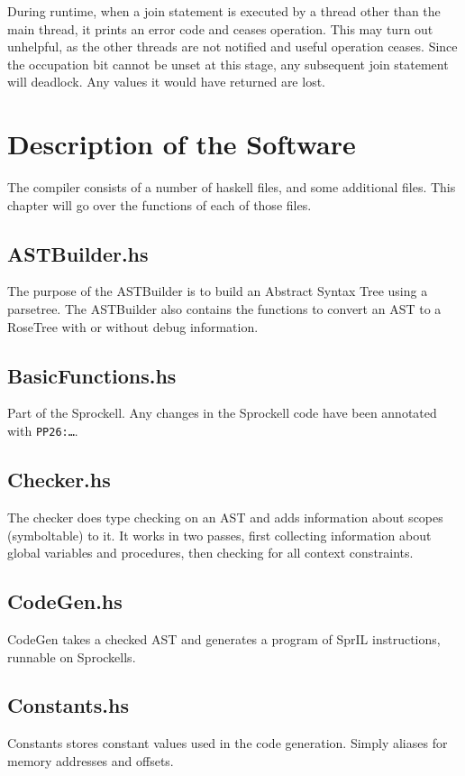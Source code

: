 \documentclass[twoside]{report}
\begin{document}
During runtime, when a join statement is executed by a thread other than the main thread, it prints an error code and ceases operation. This may turn out unhelpful, as the other threads are not notified and useful operation ceases. Since the occupation bit cannot be unset at this stage, any subsequent join statement will deadlock. Any values it would have returned are lost.

\chapter{Description of the Software}
\label{description_of_the_software}
The compiler consists of a number of haskell files, and some additional files. This chapter will go over the functions of each of those files.

\section{ASTBuilder.hs}
The purpose of the ASTBuilder is to build an Abstract Syntax Tree using a parsetree. The ASTBuilder also contains the functions to convert an AST to a RoseTree with or without debug information.

\section{BasicFunctions.hs}
Part of the Sprockell. Any changes in the Sprockell code have been annotated with \texttt{PP26:\ldots}.

\section{Checker.hs}
The checker does type checking on an AST and adds information about scopes (symboltable) to it. It works in two passes, first collecting information about global variables and procedures, then checking for all context constraints.

\section{CodeGen.hs}
CodeGen takes a checked AST and generates a program of SprIL instructions, runnable on Sprockells.

\section{Constants.hs}
Constants stores constant values used in the code generation. Simply aliases for memory addresses and offsets.
\end{document}
